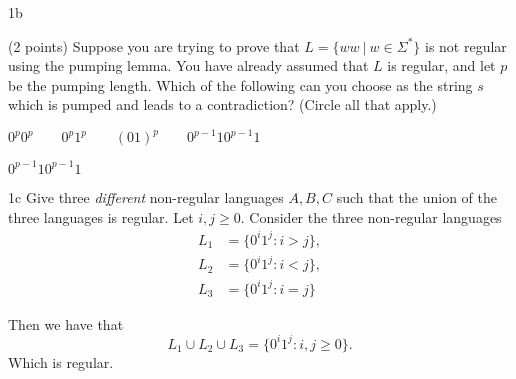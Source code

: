 \documentclass{article}
\newcommand{\set}[1]{\{#1\}}
\begin{document}
\begin{question}
    {1b}
    {
        (2 points) Suppose you are trying to prove that $L = \{ww\ |\ w \in \Sigma^*\}$ is not regular using the pumping lemma. You have already assumed that $L$ is regular, and let $p$ be the pumping length. Which of the following can you choose as the string $s$ which is pumped and leads to a contradiction? (Circle all that apply.)

        $0^p0^p \qquad 0^p1^p \qquad (01)^p \qquad 0^{p-1}10^{p-1}1$
    }
    $0^{p-1}10^{p-1}1$
\end{question}

\begin{question}
    {1c}
    {
        Give three \textit{different} non-regular languages $A,B,C$ such that the union of the three languages is regular.
    }
    Let $i,j \geq 0$. Consider the three non-regular languages
    \begin{align*}
        L_1 & = \set{0^i1^j : i > j}, \\
        L_2 & = \set{0^i1^j : i < j}, \\
        L_3 & = \set{0^i1^j : i = j}
    \end{align*}

    Then we have that
    \begin{equation*}
        L_1 \cup L_2 \cup L_3 = \set{0^i1^j : i, j \geq 0}.
    \end{equation*}
    Which is regular.
\end{question}
\end{document}

